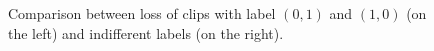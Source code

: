 \begin{figure}[t]
    \qquad
	\caption{Comparison between loss of clips with label $(0,1)$ and $(1,0)$ (on the left) and indifferent labels (on the right).}
	\label{fig:loss0501}%
\end{figure}

